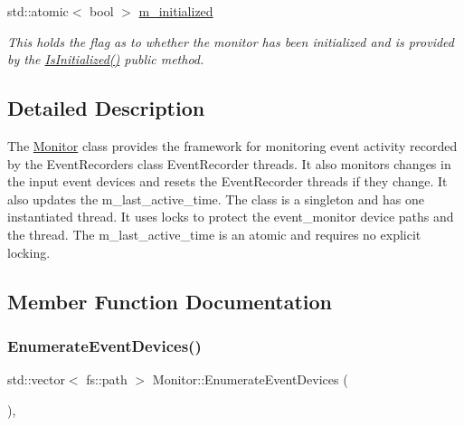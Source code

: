 \begin{DoxyCompactItemize}
\mbox{\label{classEventDetect_1_1Monitor_a875d2d618888fb23ad1cc4000f5ad320}} 
std\+::atomic$<$ bool $>$ \mbox{\hyperlink{classEventDetect_1_1Monitor_a875d2d618888fb23ad1cc4000f5ad320}{m\+\_\+initialized}}
\begin{DoxyCompactList}\small\item\em This holds the flag as to whether the monitor has been initialized and is provided by the \mbox{\hyperlink{classEventDetect_1_1Monitor_a8d0a2609e4c8613bc020e239d280dfb5}{Is\+Initialized()}} public method. \end{DoxyCompactList}\end{DoxyCompactItemize}


\subsection{Detailed Description}
The \mbox{\hyperlink{classEventDetect_1_1Monitor}{Monitor}} class provides the framework for monitoring event activity recorded by the Event\+Recorders class Event\+Recorder threads. It also monitors changes in the input event devices and resets the Event\+Recorder threads if they change. It also updates the m\+\_\+last\+\_\+active\+\_\+time. The class is a singleton and has one instantiated thread. It uses locks to protect the event\+\_\+monitor device paths and the thread. The m\+\_\+last\+\_\+active\+\_\+time is an atomic and requires no explicit locking. 

\subsection{Member Function Documentation}
\mbox{\label{classEventDetect_1_1Monitor_a46b24be7323eaa4f6e396d14108aea6e}} 
\subsubsection{\texorpdfstring{Enumerate\+Event\+Devices()}{EnumerateEventDevices()}}
{\footnotesize\ttfamily std\+::vector$<$ fs\+::path $>$ Monitor\+::\+Enumerate\+Event\+Devices (\begin{DoxyParamCaption}{ }\end{DoxyParamCaption})\hspace{0.3cm}{\ttfamily [static]}, {\ttfamily [private]}}



